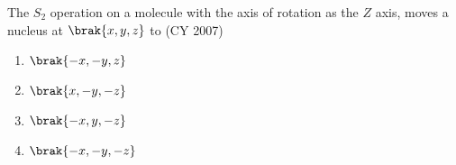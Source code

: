 \item The $S_2$ operation on a molecule with the axis of rotation as the $Z$ axis, moves a nucleus at $\brak{x, y, z}$ to \hfill (CY 2007)
\begin{multicols}{4}
\begin{enumerate}
     \item   $\brak{-x, -y, z} $  
     \item   $\brak{x, -y, -z}$ 
     \item   $\brak{-x, y, -z}$
     \item   $\brak{-x, -y, -z}$
\end{enumerate}
\end{multicols}
 
